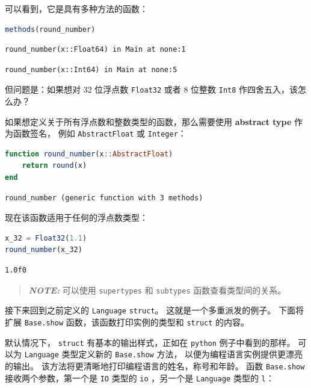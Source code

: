 \documentclass[
  notoc %
]{tufte-book}
\newcommand{\passthrough}[1]{#1}
\begin{document}
可以看到，它是具有多种方法的函数：

\begin{lstlisting}[language=Julia]
methods(round_number)
\end{lstlisting}

\begin{lstlisting}[language=Output]
round_number(x::Float64) in Main at none:1
\end{lstlisting}

\begin{lstlisting}[language=Output]
round_number(x::Int64) in Main at none:5
\end{lstlisting}

但问题是：如果想对 32 位浮点数 \passthrough{\lstinline!Float32!} 或者 8
位整数 \passthrough{\lstinline!Int8!} 作四舍五入，该怎么办？

如果想定义关于所有浮点数和整数类型的函数，那么需要使用 \textbf{abstract
type} 作为函数签名， 例如 \passthrough{\lstinline!AbstractFloat!} 或
\passthrough{\lstinline!Integer!}：

\begin{lstlisting}[language=Julia]
function round_number(x::AbstractFloat)
    return round(x)
end
\end{lstlisting}

\begin{lstlisting}[language=Output]
round_number (generic function with 3 methods)
\end{lstlisting}

现在该函数适用于任何的浮点数类型：

\begin{lstlisting}[language=Julia]
x_32 = Float32(1.1)
round_number(x_32)
\end{lstlisting}

\begin{lstlisting}[language=Output]
1.0f0
\end{lstlisting}

\begin{quote}
\textbf{\emph{NOTE:}} 可以使用 \passthrough{\lstinline!supertypes!} 和
\passthrough{\lstinline!subtypes!} 函数查看类型间的关系。
\end{quote}

接下来回到之前定义的 \passthrough{\lstinline!Language!}
\passthrough{\lstinline!struct!}。 这就是一个多重派发的例子。 下面将扩展
\passthrough{\lstinline!Base.show!} 函数，该函数打印实例的类型和
\passthrough{\lstinline!struct!} 的内容。

默认情况下， \passthrough{\lstinline!struct!} 有基本的输出样式，正如在
\passthrough{\lstinline!python!} 例子中看到的那样。 可以为
\passthrough{\lstinline!Language!} 类型定义新的
\passthrough{\lstinline!Base.show!} 方法，
以便为编程语言实例提供更漂亮的输出。
该方法将更清晰地打印编程语言的姓名，称号和年龄。 函数
\passthrough{\lstinline!Base.show!} 接收两个参数，第一个是
\passthrough{\lstinline!IO!} 类型的 \passthrough{\lstinline!io!}
，另一个是 \passthrough{\lstinline!Language!} 类型的
\passthrough{\lstinline!l!}：
\end{document}
